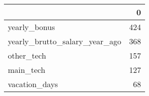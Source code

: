 \begin{tabular}{lr}
\toprule
{} &    0 \\
\midrule
yearly\_bonus                  &  424 \\
yearly\_brutto\_salary\_year\_ago &  368 \\
other\_tech                    &  157 \\
main\_tech                     &  127 \\
vacation\_days                 &   68 \\
\bottomrule
\end{tabular}
